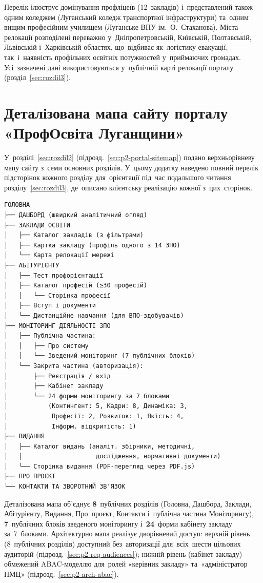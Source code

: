 Перелік ілюструє домінування профліцеїв (12~закладів) і~представлений також одним коледжем (Луганський коледж транспортної інфраструктури) та~одним вищим професійним училищем (Луганське ВПУ ім.~О.~Стаханова). Міста релокації розподілені переважно у~Дніпропетровській, Київській, Полтавській, Львівській і~Харківській областях, що~відбиває як~логістику евакуації, так~і~наявність профільних освітніх потужностей у~приймаючих громадах. Усі~зазначені дані використовуються у~публічній карті релокації порталу (розділ~\ref{sec:rozdil3}).

\clearpage
\section{Деталізована мапа сайту порталу «ПрофОсвіта Луганщини»}
\label{app:sitemap}

У~розділі~\ref{sec:rozdil2} (підрозд.~\ref{sec:p2-portal-sitemap}) подано верхньорівневу мапу сайту з~семи основних розділів. У~цьому додатку наведено повний перелік підсторінок кожного розділу для~орієнтації під~час подальшого читання розділу~\ref{sec:rozdil3}, де~описано клієнтську реалізацію кожної з~цих~сторінок.

\begin{verbatim}
ГОЛОВНА
├── ДАШБОРД (швидкий аналітичний огляд)
├── ЗАКЛАДИ ОСВІТИ
│   ├── Каталог закладів (з фільтрами)
│   ├── Картка закладу (профіль одного з 14 ЗПО)
│   └── Карта релокації мережі
├── АБІТУРІЄНТУ
│   ├── Тест профорієнтації
│   ├── Каталог професій (≥30 професій)
│   │   └── Сторінка професії
│   ├── Вступ і документи
│   └── Дистанційне навчання (для ВПО-здобувачів)
├── МОНІТОРИНГ ДІЯЛЬНОСТІ ЗПО
│   ├── Публічна частина:
│   │   ├── Про систему
│   │   └── Зведений моніторинг (7 публічних блоків)
│   └── Закрита частина (авторизація):
│       ├── Реєстрація / вхід
│       ├── Кабінет закладу
│       └── 24 форми моніторингу за 7 блоками
│           (Контингент: 5, Кадри: 8, Динаміка: 3,
│            Професії: 2, Розвиток: 1, Якість: 4,
│            Інформ. відкритість: 1)
├── ВИДАННЯ
│   ├── Каталог видань (аналіт. збірники, методичні,
│   │                    дослідження, нормативні документи)
│   └── Сторінка видання (PDF-перегляд через PDF.js)
├── ПРО ПРОЄКТ
└── КОНТАКТИ ТА ЗВОРОТНИЙ ЗВ'ЯЗОК
\end{verbatim}

Деталізована мапа об'єднує \textbf{8}~публічних розділів (Головна, Дашборд, Заклади, Абітурієнту, Видання, Про~проєкт, Контакти і~публічна частина Моніторингу), \textbf{7}~публічних блоків зведеного моніторингу і~\textbf{24}~форми кабінету закладу за~7~блоками. Архітектурно мапа реалізує дворівневий доступ: верхній рівень (8~публічних розділів) доступний без~авторизації для~всіх~шести цільових аудиторій (підрозд.~\ref{sec:p2-req-audiences}); нижній рівень (кабінет закладу) обмежений ABAC-моделлю для~ролей «керівник закладу» та~«адміністратор НМЦ» (підрозд.~\ref{sec:p2-arch-abac}).

